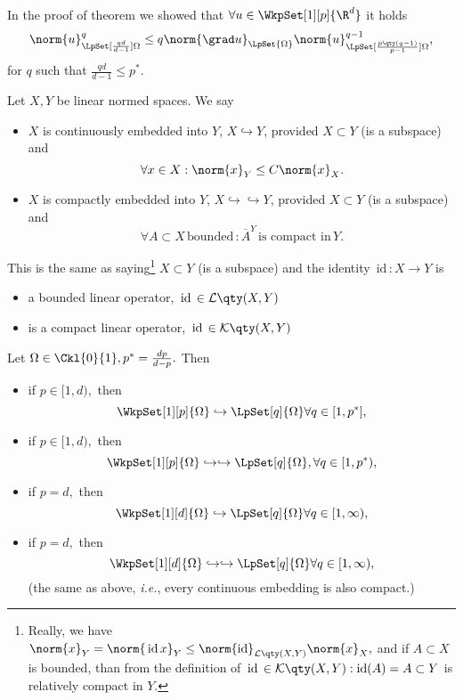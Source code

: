 \begin{remark}
	In the proof of theorem we showed that $\forall u \in \WkpSet[1][p]{\R^d}$ it holds
	\[
		\norm{u}_{\LpSet[\frac{qd}{d-1}]{\Omega}}^q \leq q\norm{\grad u}_{\LpSet{\Omega}} \norm{u}_{\LpSet[\frac{p\qty(q-1)}{p-1}]{\Omega}}^{q-1},
	\]
	for $q$ such that $\frac{qd}{d-1}\leq p^{*}$.
\end{remark}


\begin{definition}
    Let $X,Y$ be linear normed spaces. We say 

    \begin{itemize}
	    \item $X$ is continuously embedded into $Y$, $X \hookrightarrow Y$, provided $X \subset Y$ (is a subspace) and
		    \[
			    \forall x \in X: \norm{x}_Y \leq C \norm{x}_X.
		    \]
	    \item $X$ is compactly embedded into $Y$, $X \hookrightarrow \hookrightarrow Y$, provided $X \subset Y$ (is a subspace) and
		    \[
			    \forall A \subset X \, \text{bounded} \,: \overline{A}^{Y} \, \text{is compact in} \, Y.
		    \]
    \end{itemize}
    This is the same as saying\footnote{Really, we have $\norm{x}_{Y} = \norm{\, \text{id} \,x}_Y \leq \norm{\text{id}}_{\mathcal{L}\qty(X,Y)}\norm{x}_X,$ and if $A \subset X$ is bounded, than from the definition of $\, \text{id} \, \in \mathcal{K}\qty(X,Y): \text{id}(A) = A \subset Y$ is relatively compact in $Y$.} $X \subset Y$ (is a subspace) and the identity $\, \text{id} \,: X \to Y$ is
    \begin{itemize}
	    \item a bounded linear operator, $\, \text{id} \, \in \mathcal{L}\qty(X,Y)$
	    \item is a compact linear operator, $\, \text{id} \, \in \mathcal{K}\qty(X,Y)$
    \end{itemize}
\end{definition}

\begin{theorem}
	Let $\Omega \in \Ckl{0}{1}, p^{*} = \frac{dp}{d-p}.$ Then

	\begin{itemize}
		\item if $p \in [1,d),$ then
			\[
				\WkpSet[1][p]{\Omega} \hookrightarrow \LpSet[q]{\Omega} \forall q \in [1,p^{*}],
			\]
		\item if $p \in [1,d),$ then
			\[
				\WkpSet[1][p]{\Omega} \hookrightarrow \hookrightarrow \LpSet[q]{\Omega}, \forall q \in [1,p^{*}),
			\]
		\item if $p = d,$ then
			\[
				\WkpSet[1][d]{\Omega} \hookrightarrow \LpSet[q]{\Omega} \forall q \in [1, \infty),
			\]
		\item if $p = d, $ then
			\[
				\WkpSet[1][d]{\Omega} \hookrightarrow \hookrightarrow \LpSet[q]{\Omega} \forall q \in [1,\infty),
			\]
			(the same as above, \textit{i.e.}, every continuous embedding is also compact.)
	\end{itemize}
\end{theorem}

